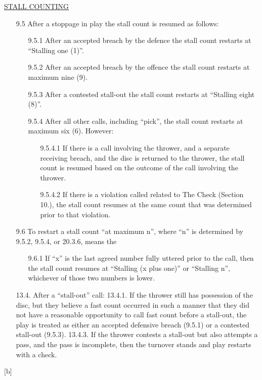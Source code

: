 \underline{\uppercase{stall counting}}
\begin{itemize}
    \item[9.5] After a stoppage in play the stall count is resumed as follows:
        \begin{itemize}
            \item[9.5.1] After an accepted breach by the defence the stall count restarts at “Stalling one (1)”.
            \item[9.5.2] After an accepted breach by the offence the stall count restarts at maximum nine (9).
            \item[9.5.3] After a contested stall-out the stall count restarts at “Stalling eight (8)”.
            \item[9.5.4] After all other calls, including “pick”, the stall count restarts at maximum six (6). However:
                \begin{itemize}
                    \item[9.5.4.1] If there is a call involving the thrower, and a separate receiving breach, and the disc is returned to the thrower, the stall count is resumed based on the outcome of the call involving the thrower.
                    \item[9.5.4.2] If there is a violation called related to The Check (Section 10.), the stall count resumes at the same count that was determined prior to that violation.
                \end{itemize}
        \end{itemize}
            \item[9.6] To restart a stall count “at maximum n”, where “n” is determined by 9.5.2, 9.5.4, or 20.3.6, means the
                \begin{itemize}
                    \item[9.6.1] If “x” is the last agreed number fully uttered prior to the call, then the stall count resumes at “Stalling (x plus one)” or “Stalling n”, whichever of those two numbers is lower.
                \end{itemize}

13.4. After a “stall-out” call:
13.4.1. If the thrower still has possession of the disc, but they believe a fast count occurred in such a
manner that they did not have a reasonable opportunity to call fast count before a stall-out, the
play is treated as either an accepted defensive breach (9.5.1) or a contested stall-out (9.5.3).
13.4.3. If the thrower contests a stall-out but also attempts a pass, and the pass is incomplete, then the
turnover stands and play restarts with a check.
\end{itemize}
\begin{center}[b]\end{center}

